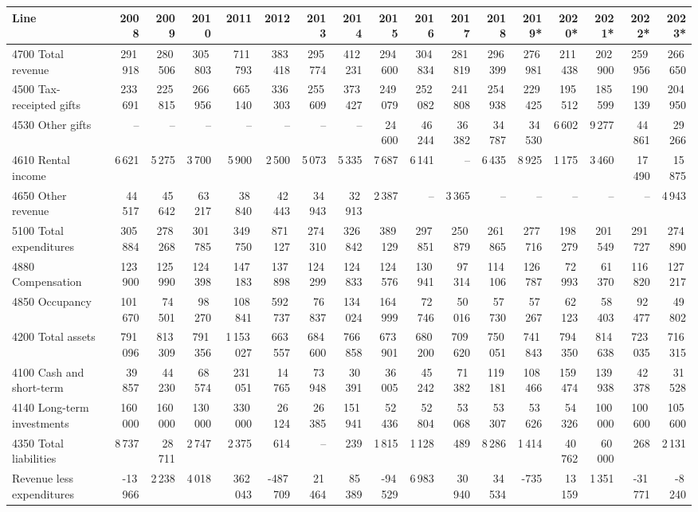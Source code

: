 \begin{tabular}{@{}lrrrrrrrrrrrrrrrr@{}}\toprule
Line & 2008 & 2009 & 2010 & 2011 & 2012 & 2013 & 2014 & 2015 & 2016 & 2017 & 2018 & 2019* & 2020* & 2021* & 2022* & 2023* \\\midrule
4700 Total revenue & 291\,918 & 280\,506 & 305\,803 & 711\,793 & 383\,418 & 295\,774 & 412\,231 & 294\,600 & 304\,834 & 281\,819 & 296\,399 & 276\,981 & 211\,438 & 202\,900 & 259\,956 & 266\,650 \\
4500 Tax-receipted gifts & 233\,691 & 225\,815 & 266\,956 & 665\,140 & 336\,303 & 255\,609 & 373\,427 & 249\,079 & 252\,082 & 241\,808 & 254\,938 & 229\,425 & 195\,512 & 185\,599 & 190\,139 & 204\,950 \\
4530 Other gifts & -- & -- & -- & -- & -- & -- & -- & 24\,600 & 46\,244 & 36\,382 & 34\,787 & 34\,530 & 6\,602 & 9\,277 & 44\,861 & 29\,266 \\
4610 Rental income & 6\,621 & 5\,275 & 3\,700 & 5\,900 & 2\,500 & 5\,073 & 5\,335 & 7\,687 & 6\,141 & -- & 6\,435 & 8\,925 & 1\,175 & 3\,460 & 17\,490 & 15\,875 \\
4650 Other revenue & 44\,517 & 45\,642 & 63\,217 & 38\,840 & 42\,443 & 34\,943 & 32\,913 & 2\,387 & -- & 3\,365 & -- & -- & -- & -- & -- & 4\,943 \\
5100 Total expenditures & 305\,884 & 278\,268 & 301\,785 & 349\,750 & 871\,127 & 274\,310 & 326\,842 & 389\,129 & 297\,851 & 250\,879 & 261\,865 & 277\,716 & 198\,279 & 201\,549 & 291\,727 & 274\,890 \\
4880 Compensation & 123\,900 & 125\,990 & 124\,398 & 147\,183 & 137\,898 & 124\,299 & 124\,833 & 124\,576 & 130\,941 & 97\,314 & 114\,106 & 126\,787 & 72\,993 & 61\,370 & 116\,820 & 127\,217 \\
4850 Occupancy & 101\,670 & 74\,501 & 98\,270 & 108\,841 & 592\,737 & 76\,837 & 134\,024 & 164\,999 & 72\,746 & 50\,016 & 57\,730 & 57\,267 & 62\,123 & 58\,403 & 92\,477 & 49\,802 \\
4200 Total assets & 791\,096 & 813\,309 & 791\,356 & 1\,153\,027 & 663\,557 & 684\,600 & 766\,858 & 673\,901 & 680\,200 & 709\,620 & 750\,051 & 741\,843 & 794\,350 & 814\,638 & 723\,035 & 716\,315 \\
4100 Cash and short-term & 39\,857 & 44\,230 & 68\,574 & 231\,051 & 14\,765 & 73\,948 & 30\,391 & 36\,005 & 45\,242 & 71\,382 & 119\,181 & 108\,466 & 159\,474 & 139\,938 & 42\,378 & 31\,528 \\
4140 Long-term investments & 160\,000 & 160\,000 & 130\,000 & 330\,000 & 26\,124 & 26\,385 & 151\,941 & 52\,436 & 52\,804 & 53\,068 & 53\,307 & 53\,626 & 54\,326 & 100\,000 & 100\,600 & 105\,600 \\
4350 Total liabilities & 8\,737 & 28\,711 & 2\,747 & 2\,375 & 614 & -- & 239 & 1\,815 & 1\,128 & 489 & 8\,286 & 1\,414 & 40\,762 & 60\,000 & 268 & 2\,131 \\
Revenue less expenditures & -13\,966 & 2\,238 & 4\,018 & 362\,043 & -487\,709 & 21\,464 & 85\,389 & -94\,529 & 6\,983 & 30\,940 & 34\,534 & -735 & 13\,159 & 1\,351 & -31\,771 & -8\,240 \\\bottomrule
\end{tabular}
